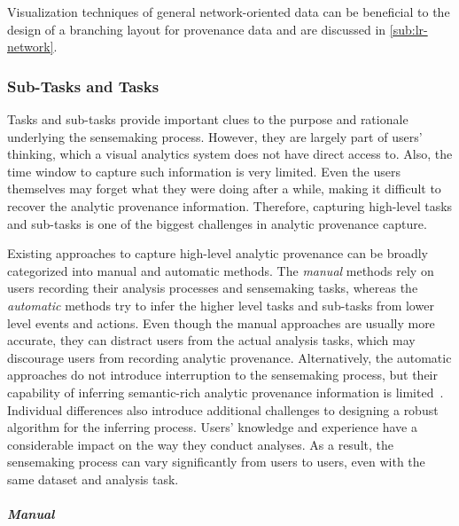 Visualization techniques of general network-oriented data can be beneficial to the design of a branching layout for provenance data and are discussed in \autoref{sub:lr-network}.

\subsubsection{Sub-Tasks and Tasks}
Tasks and sub-tasks provide important clues to the purpose and rationale underlying the sensemaking process. However, they are largely part of users' thinking, which a visual analytics system does not have direct access to. Also, the time window to capture such information is very limited. Even the users themselves may forget what they were doing after a while, making it difficult to recover the analytic provenance information. Therefore, capturing high-level tasks and sub-tasks is one of the biggest challenges in analytic provenance capture.

Existing approaches to capture high-level analytic provenance can be broadly categorized into manual and automatic methods. The \emph{manual} methods rely on users recording their analysis processes and sensemaking tasks, whereas the \emph{automatic} methods try to infer the higher level tasks and sub-tasks from lower level events and actions. Even though the manual approaches are usually more accurate, they can distract users from the actual analysis tasks, which may discourage users from recording analytic provenance. Alternatively, the automatic approaches do not introduce interruption to the sensemaking process, but their capability of inferring semantic-rich analytic provenance information is limited~\cite{Gotz2009}. Individual differences also introduce additional challenges to designing a robust algorithm for the inferring process. Users' knowledge and experience have a considerable impact on the way they conduct analyses. As a result, the sensemaking process can vary significantly from users to users, even with the same dataset and analysis task. 

\subparagraph{Manual}

